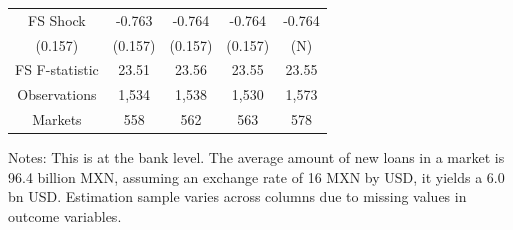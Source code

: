 \begin{threeparttable}
\begin{tabular}{lccccccccc}
\multicolumn{2}{c}{FS Shock} & \multicolumn{2}{c}{-0.763} & \multicolumn{2}{c}{-0.764} & \multicolumn{2}{c}{-0.764} & \multicolumn{2}{c}{-0.764} \\
\multicolumn{2}{c}{(0.157)} & \multicolumn{2}{c}{(0.157)} & \multicolumn{2}{c}{(0.157)} & \multicolumn{2}{c}{(0.157)} & \multicolumn{2}{c}{(N)} \\
\multicolumn{2}{c}{FS F-statistic} & \multicolumn{2}{c}{23.51} & \multicolumn{2}{c}{23.56} & \multicolumn{2}{c}{23.55} & \multicolumn{2}{c}{23.55} \\
\multicolumn{2}{c}{Observations} & \multicolumn{2}{c}{1,534} & \multicolumn{2}{c}{1,538} & \multicolumn{2}{c}{1,530} & \multicolumn{2}{c}{1,573}  \\
\multicolumn{2}{c}{Markets} & \multicolumn{2}{c}{558} & \multicolumn{2}{c}{562} & \multicolumn{2}{c}{563} & \multicolumn{2}{c}{578}  \\

\bottomrule
\end{tabular}
\begin{tablenotes}[flushleft]
\tiny
\item Notes: This is at the bank level. The average amount of new loans in a market is 96.4 billion MXN, assuming an exchange rate of 16 MXN by USD, it yields a 6.0 bn USD. Estimation sample varies across columns due to missing values in outcome variables.
\end{tablenotes}
\end{threeparttable}
